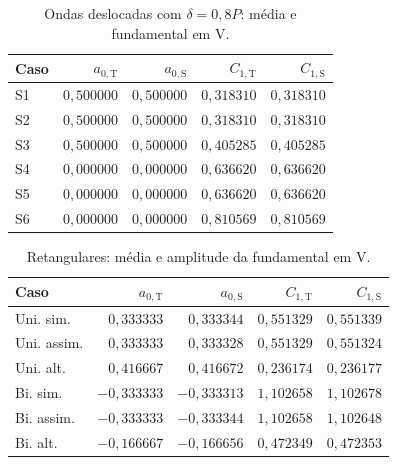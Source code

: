 \begin{table}[H]
\centering
\footnotesize\setlength{\tabcolsep}{3.5pt}
\caption{Ondas deslocadas com $\delta=0{,}8P$: média e fundamental em V.}\label{tab:fft_08P}
\begin{tabular}{lrrrr}\hline
Caso & $a_{0,\mathrm T}$ & $a_{0,\mathrm S}$ & $C_{1,\mathrm T}$ & $C_{1,\mathrm S}$ \\ \hline
S1 & $0{,}500000$ & $0{,}500000$ & $0{,}318310$ & $0{,}318310$ \\
S2 & $0{,}500000$ & $0{,}500000$ & $0{,}318310$ & $0{,}318310$ \\
S3 & $0{,}500000$ & $0{,}500000$ & $0{,}405285$ & $0{,}405285$ \\
S4 & $0{,}000000$ & $0{,}000000$ & $0{,}636620$ & $0{,}636620$ \\
S5 & $0{,}000000$ & $0{,}000000$ & $0{,}636620$ & $0{,}636620$ \\
S6 & $0{,}000000$ & $0{,}000000$ & $0{,}810569$ & $0{,}810569$ \\
\hline\end{tabular}
\end{table}
\begin{table}[H]
\centering
\footnotesize\setlength{\tabcolsep}{3.5pt}
\caption{Retangulares: média e amplitude da fundamental em V.}\label{tab:fft_ret}
\begin{tabular}{lrrrr}\hline
Caso & $a_{0,\mathrm T}$ & $a_{0,\mathrm S}$ & $C_{1,\mathrm T}$ & $C_{1,\mathrm S}$ \\ \hline
Uni. sim. & $0{,}333333$ & $0{,}333344$ & $0{,}551329$ & $0{,}551339$ \\
Uni. assim. & $0{,}333333$ & $0{,}333328$ & $0{,}551329$ & $0{,}551324$ \\
Uni. alt. & $0{,}416667$ & $0{,}416672$ & $0{,}236174$ & $0{,}236177$ \\
Bi. sim. & $-0{,}333333$ & $-0{,}333313$ & $1{,}102658$ & $1{,}102678$ \\
Bi. assim. & $-0{,}333333$ & $-0{,}333344$ & $1{,}102658$ & $1{,}102648$ \\
Bi. alt. & $-0{,}166667$ & $-0{,}166656$ & $0{,}472349$ & $0{,}472353$ \\
\hline\end{tabular}
\end{table}
